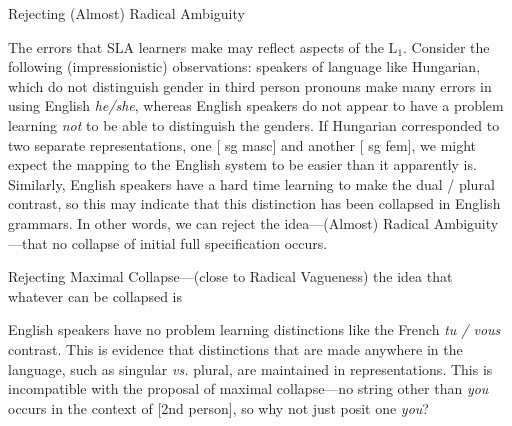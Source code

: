 \documentclass[10pt]{article}
\begin{document}
\begin{example}Rejecting (Almost) Radical Ambiguity
\end{example}
\noindent The errors that SLA learners make may reflect aspects of the L$_1$. Consider the following (impressionistic) observations: speakers of language like Hungarian, which do not distinguish gender in third person pronouns make many errors in using English {\it he/she}, whereas English speakers do not appear to have a problem learning {\it not} to be able to distinguish the genders. If Hungarian  {\it {}} corresponded to two separate representations, one [{ sg masc]} and another [{ sg fem]}, we might expect the mapping to the English system to be easier than it apparently is. Similarly, English speakers have a hard time learning to make the {\sc dual} / {\sc plural} contrast, so this may indicate that this distinction has been collapsed in English grammars. In other words, we can reject the idea---(Almost) Radical Ambiguity---that no collapse of initial full specification occurs.


\begin{example} Rejecting Maximal Collapse---(close to Radical Vagueness) the idea that whatever can be collapsed is
\end{example}
\noindent English speakers have no problem learning distinctions like the French {\it tu / vous} contrast. This is evidence that distinctions that are made anywhere in the language, such as {\sc singular} {\it vs.} {\sc plural}, are maintained in representations. This is incompatible with the proposal of maximal collapse---no string other than {\it you} occurs in the context of [2nd person], so why not just posit one {\it you}?
\end{document}

